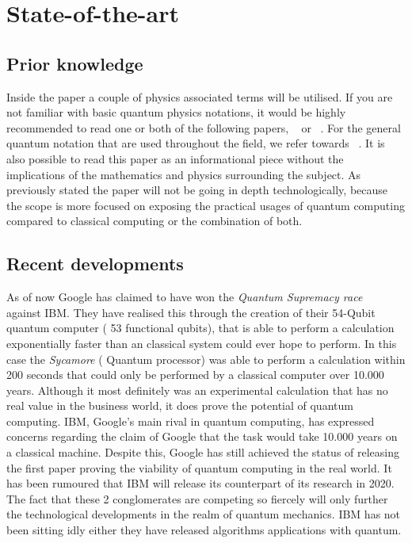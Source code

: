 
\section{State-of-the-art}
\label{sec:state-of-the-art}
\subsection{Prior knowledge}
Inside the paper a couple of physics associated terms will be utilised. If you are not familiar with basic quantum physics notations, it would be highly recommended to read one or both of the following papers, ~\textcite{Rieffel1998} or ~\textcite{Shor2000}. For the general quantum notation that are used throughout the field, we refer towards ~\textcite{Dirac1939}. It is also possible to read this paper as an informational piece without the implications of the mathematics and physics surrounding the subject. As previously stated the paper will not be going in depth technologically, because the scope is more focused on exposing the practical usages of quantum computing compared to classical computing or the combination of both.

\subsection{Recent developments}

As of now Google has claimed to have won the \emph{Quantum Supremacy race} ~\autocite{Google2019} against IBM. They have realised this through the creation of their 54-Qubit quantum computer ( 53 functional qubits), that is able to perform a calculation exponentially faster than an classical system could ever hope to perform. In this case the \emph{Sycamore} ( Quantum processor) was able to perform a calculation within 200 seconds that could only be performed by a classical computer over 10.000 years. Although it most definitely was an experimental calculation that has no real value in the business world, it does prove the potential of quantum computing. IBM, Google's main rival in quantum computing, has expressed concerns regarding the claim of Google that the task would take 10.000 years on a classical machine. Despite this, Google has still achieved the status of releasing the first paper proving the viability of quantum computing in the real world. It has been rumoured that IBM will release its counterpart of its research in 2020. The fact that these 2 conglomerates are competing so fiercely will only further the technological developments in the realm of quantum mechanics. IBM has not been sitting idly either they have released algorithms applications with quantum. \autocite{IBM2019}



